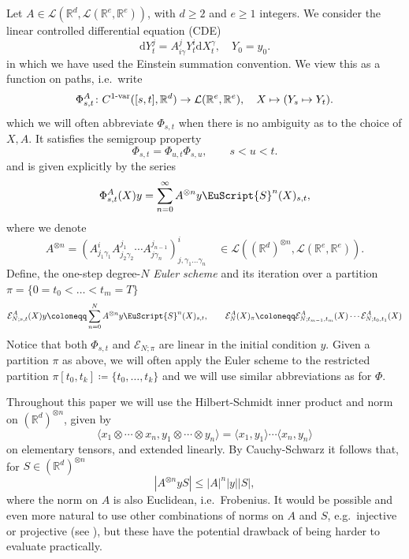 \documentclass{article}
\def\d{\mathrm{d}}
\newcommand{\var}[1]{{#1 \mathchar"2D \mathrm{var}}}
\def\Sig{\EuScript{S}}
\def\bbR{\mathbb{R}}
\def\cE{\mathcal{E}}
\numberwithin{equation}{section}
\theoremstyle{definition}
\theoremstyle{remark}
\begin{document}
Let $A \in \mathcal L(\mathbb R^d, \mathcal L(\mathbb R^e, \mathbb R^e))$, with $d \geq 2$ and $e \geq 1$ integers. We consider the linear controlled differential equation (CDE)
\begin{equation}\label{eq:linear}
\d Y_t^j = A^j_{i\gamma} Y_t^i \d X^\gamma_t, \quad Y_0 = y_0 .
\end{equation}
in which we have used the Einstein summation convention. We view this as a function on paths, i.e.\ write
\begin{equation}
\Phi^A_{s,t} \colon C^\var{1}([s,t],\mathbb R^d) \to \mathcal L(\mathbb R^e, \mathbb R^e) , \quad X \mapsto (Y_s \mapsto Y_t) .
\end{equation}
which we will often abbreviate $\Phi_{s,t}$ when there is no ambiguity as to the choice of $X, A$. It satisfies the semigroup property
\[
\Phi_{s,t} = \Phi_{u,t}   \Phi_{s,u},\qquad s < u < t.
\]
and is given explicitly by the series \cite[Theorem 4.5]{LCL}
\begin{equation}\label{eq:AyS}
\Phi^A_{s,t}(X)y = \sum_{n = 0}^\infty A^{\otimes n} y \Sig^n(X)_{s,t} ,
\end{equation}
where we denote
\[
A^{\otimes n} = (A^i_{j_1\gamma_1} A^{j_1}_{j_2\gamma_2} \cdots A^{j_{n-1}}_{j\gamma_n})^i_{j, \gamma_1\ldots \gamma_n} \quad \in \mathcal L((\bbR^d)^{\otimes n}, \mathcal L(\mathbb R^e, \bbR^e)) .
\]
Define, the one-step degree-$N$ \emph{Euler scheme} and its iteration over a partition $\pi = \{0 = t_0 <\ldots < t_m = T\}$
\begin{equation}
\mathcal E^A_{N;s,t}(X)y \coloneqq \sum_{n = 0}^N A^{\otimes n} y \Sig^n(X)_{s,t}, \qquad \mathcal E^A_N(X)_{\pi} \coloneqq \mathcal E^A_{N;t_{m-1},t_m}(X) \cdots \mathcal E^A_{N;t_0,t_1}(X)
\end{equation}
Notice that both $\Phi_{s,t}$ and $\cE_{N;\pi}$ are linear in the initial condition $y$. Given a partition $\pi$ as above, we will often apply the Euler scheme to the restricted partition $\pi[t_0,t_k] \coloneqq \{t_0,\ldots, t_k\}$ and we will use similar abbreviations as for $\Phi$.

Throughout this paper we will use the Hilbert-Schmidt inner product and norm on $(\mathbb R^d)^{\otimes n}$, given by
\[
\langle x_1 \otimes \cdots \otimes x_n , y_1 \otimes \cdots \otimes y_n \rangle = \langle x_1, y_1 \rangle \cdots \langle x_n, y_n \rangle
\]
on elementary tensors, and extended linearly. By Cauchy-Schwarz it follows that, for $S \in (\bbR^d)^{\otimes n}$
\begin{equation}\label{eq:AySleq}
|A^{\otimes n}yS| \leq |A|^n |y| |S|,
\end{equation}
where the norm on $A$ is also Euclidean, i.e.\ Frobenius. It would be possible and even more natural to use other combinations of norms on $A$ and $S$, e.g.\ injective or projective (see \cite[Appendix 5.6]{LQ02}), but these have the potential drawback of being harder to evaluate practically.
\end{document}
